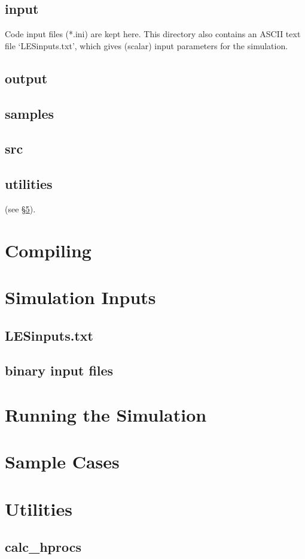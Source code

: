 \documentclass[11pt]{article}
\begin{document}
\subsection{input} Code input files (*.ini) are kept here.  This directory also contains an ASCII text file `LESinputs.txt', which gives (scalar) input parameters for the simulation.

\subsection{output}

\subsection{samples}

\subsection{src}

\subsection{utilities}(see \S \ref{utilities}).


\newpage
\section{Compiling}\label{compiling}

\newpage
\section{Simulation Inputs}\label{simulation_inputs}

\subsection{LESinputs.txt}

\subsection{binary input files}

\newpage
\section{Running the Simulation}\label{running_the_simulation}

\newpage
\section{Sample Cases}\label{sample_cases}

\newpage
\section{Utilities}\label{utilities}

\subsection{calc\_hprocs}

\clearpage



\end{document}

